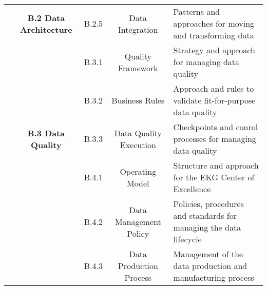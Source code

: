 \begin{table}[ht]
\begin{tabular}{@{}cclcl@{}}
    \cellcolor[HTML]{2F5496}{}                                            & \multirow{-5}{*}{\cellcolor[HTML]{8EAADB}\textbf{B.2 Data Architecture}}           & \cellcolor[HTML]{B4C6E7}B.2.5 & \cellcolor[HTML]{B4C6E7}Data Integration             & \cellcolor[HTML]{D9E2F3}Patterns and approaches for moving and transforming data               \\
    \cellcolor[HTML]{2F5496}{}                                            & \cellcolor[HTML]{8EAADB}                                                           & \cellcolor[HTML]{B4C6E7}B.3.1 & \cellcolor[HTML]{B4C6E7}Quality Framework            & \cellcolor[HTML]{D9E2F3}Strategy and approach for managing data quality                        \\
    \cellcolor[HTML]{2F5496}{}                                            & \cellcolor[HTML]{8EAADB}                                                           & \cellcolor[HTML]{B4C6E7}B.3.2 & \cellcolor[HTML]{B4C6E7}Business Rules               & \cellcolor[HTML]{D9E2F3}Approach and rules to validate fit-for-purpose data quality            \\
    \cellcolor[HTML]{2F5496}{}                                            & \multirow{-3}{*}{\cellcolor[HTML]{8EAADB}\textbf{B.3 Data Quality}}                & \cellcolor[HTML]{B4C6E7}B.3.3 & \cellcolor[HTML]{B4C6E7}Data Quality Execution       & \cellcolor[HTML]{D9E2F3}Checkpoints and conrol processes for managing data quality             \\
    \cellcolor[HTML]{2F5496}{}                                            & \cellcolor[HTML]{8EAADB}                                                           & \cellcolor[HTML]{B4C6E7}B.4.1 & \cellcolor[HTML]{B4C6E7}Operating Model              & \cellcolor[HTML]{D9E2F3}Structure and approach for the EKG Center of Excellence                \\
    \cellcolor[HTML]{2F5496}{}                                            & \cellcolor[HTML]{8EAADB}                                                           & \cellcolor[HTML]{B4C6E7}B.4.2 & \cellcolor[HTML]{B4C6E7}Data Management Policy       & \cellcolor[HTML]{D9E2F3}Policies, procedures and standards for managing the data lifecycle     \\
    \cellcolor[HTML]{2F5496}{}                                            & \cellcolor[HTML]{8EAADB}                                                           & \cellcolor[HTML]{B4C6E7}B.4.3 & \cellcolor[HTML]{B4C6E7}Data Production Process      & \cellcolor[HTML]{D9E2F3}Management of the data production and manufacturing process            \\

\end{tabular}
\end{table}
